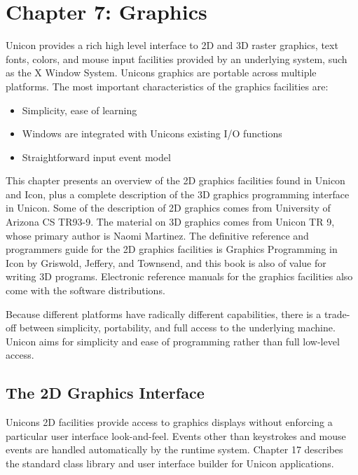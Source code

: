 \clearpage\section{Chapter 7: Graphics}

Unicon provides a rich high level interface to 2D and 3D raster
graphics, text fonts, colors, and mouse input facilities provided by an
underlying system, such as the X Window System.
Unicon{\textquotesingle}s graphics are portable across multiple
platforms. The most important characteristics of the graphics
facilities are:

\begin{itemize}\itemsep0pt
\item Simplicity, ease of learning
\item Windows are integrated with Unicon{\textquotesingle}s existing I/O
functions
\item Straightforward input event model
\end{itemize}
This chapter presents an overview of the 2D graphics facilities found in
Unicon and Icon, plus a complete description of the 3D graphics
programming interface in Unicon. Some of the description of 2D graphics
comes from University of Arizona CS TR93-9. The material on 3D graphics
comes from Unicon TR 9, whose primary author is Naomi Martinez. The
definitive reference and programmer{\textquotesingle}s guide for the 2D
graphics facilities is {\textquotedbl}Graphics Programming in
Icon{\textquotedbl} by Griswold, Jeffery, and Townsend, and this book
is also of value for writing 3D programs. Electronic reference manuals
for the graphics facilities also come with the software distributions.

Because different platforms have radically different capabilities, there
is a trade-off between simplicity, portability, and full access to the
underlying machine. Unicon aims for simplicity and ease of programming
rather than full low-level access.

\subsection{The 2D Graphics Interface}

Unicon{\textquotesingle}s 2D facilities provide access to graphics
displays without enforcing a particular user interface look-and-feel.
Events other than keystrokes and mouse events are handled automatically
by the runtime system. Chapter 17 describes the standard class library
and user interface builder for Unicon applications.

